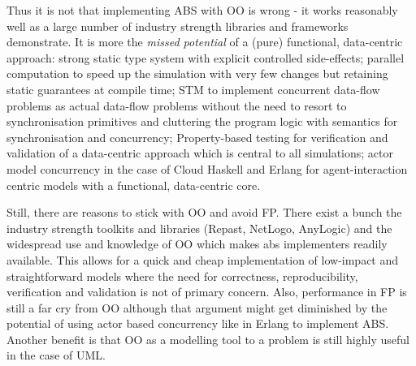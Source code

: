 \medskip

Thus it is not that implementing ABS with OO is wrong - it works reasonably well as a large number of industry strength libraries and frameworks demonstrate. It is more the \textit{missed potential} of a (pure) functional, data-centric approach: strong static type system with explicit controlled side-effects; parallel computation to speed up the simulation with very few changes but retaining static guarantees at compile time; STM to implement concurrent data-flow problems as actual data-flow problems without the need to resort to synchronisation primitives and cluttering the program logic with semantics for synchronisation and concurrency; Property-based testing for verification and validation of a data-centric approach which is central to all simulations; actor model concurrency in the case of Cloud Haskell and Erlang for agent-interaction centric models with a functional, data-centric core. 

Still, there are reasons to stick with OO and avoid FP. There exist a bunch the industry strength toolkits and libraries (Repast, NetLogo, AnyLogic) and the widespread use and knowledge of OO which makes abs implementers readily available. This allows for a quick and cheap implementation of low-impact and straightforward models where the need for correctness, reproducibility, verification and validation is not of primary concern. Also, performance in FP is still a far cry from OO although that argument might get diminished by the potential of using actor based concurrency like in Erlang to implement ABS. Another benefit is that OO as a modelling tool to a problem is still highly useful in the case of UML. %

